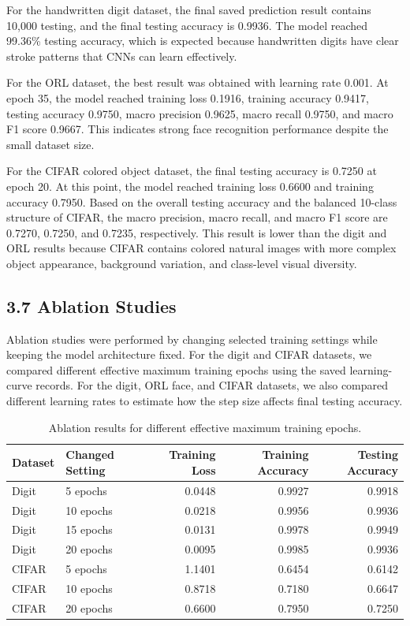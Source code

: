 \documentclass[10pt]{article}
\begin{document}
For the handwritten digit dataset, the final saved prediction result contains 10,000 testing, and the final testing accuracy is 0.9936. The model reached 99.36\% testing accuracy, which is expected because handwritten digits have clear stroke patterns that CNNs can learn effectively.

For the ORL dataset, the best result was obtained with learning rate 0.001. At epoch 35, the model reached training loss 0.1916, training accuracy 0.9417, testing accuracy 0.9750, macro precision 0.9625, macro recall 0.9750, and macro F1 score 0.9667. This indicates strong face recognition performance despite the small dataset size.

For the CIFAR colored object dataset, the final testing accuracy is 0.7250 at epoch 20. At this point, the model reached training loss 0.6600 and training accuracy 0.7950. Based on the overall testing accuracy and the balanced 10-class structure of CIFAR, the macro precision, macro recall, and macro F1 score are 0.7270, 0.7250, and 0.7235, respectively. This result is lower than the digit and ORL results because CIFAR contains colored natural images with more complex object appearance, background variation, and class-level visual diversity.

\subsection*{3.7 Ablation Studies}

Ablation studies were performed by changing selected training settings while keeping the model architecture fixed. For the digit and CIFAR datasets, we compared different effective maximum training epochs using the saved learning-curve records. For the digit, ORL face, and CIFAR datasets, we also compared different learning rates to estimate how the step size affects final testing accuracy.

\begin{table}[H]
\centering
\renewcommand{\arraystretch}{1.05}
\begin{tabular}{l l r r r}
\toprule
Dataset & Changed Setting & Training Loss & Training Accuracy & Testing Accuracy \\
\midrule
Digit & 5 epochs & 0.0448 & 0.9927 & 0.9918 \\
Digit & 10 epochs & 0.0218 & 0.9956 & 0.9936 \\
Digit & 15 epochs & 0.0131 & 0.9978 & 0.9949 \\
Digit & 20 epochs & 0.0095 & 0.9985 & 0.9936 \\
CIFAR & 5 epochs & 1.1401 & 0.6454 & 0.6142 \\
CIFAR & 10 epochs & 0.8718 & 0.7180 & 0.6647 \\
CIFAR & 20 epochs & 0.6600 & 0.7950 & 0.7250 \\
\bottomrule
\end{tabular}
\caption{Ablation results for different effective maximum training epochs.}
\end{table}
\end{document}
